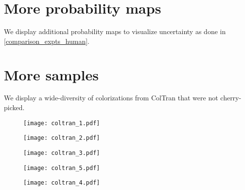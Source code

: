 \documentclass{article} \usepackage{iclr2021_conference,times}
\begin{document}
\section{More probability maps}




We display additional probability maps to visualize uncertainty as done in \ref{comparison_expts_human}.


\section{More samples}

We display a wide-diversity of colorizations from ColTran that were not cherry-picked.
\begin{figure}[htp]
\centering
\setlength{\lineskip}{0pt}

  \texttt{[image: coltran\_1.pdf]}
\end{figure}

\begin{figure}[htp]
\centering
\setlength{\lineskip}{0pt}

  \texttt{[image: coltran\_2.pdf]}
\end{figure}

\begin{figure}[htp]
\centering
\setlength{\lineskip}{0pt}

  \texttt{[image: coltran\_3.pdf]}
\end{figure}

\begin{figure}[htp]
\centering
\setlength{\lineskip}{0pt}

  \texttt{[image: coltran\_5.pdf]}
\end{figure}

\begin{figure}[htp]
\centering
\setlength{\lineskip}{0pt}

  \texttt{[image: coltran\_4.pdf]}
\end{figure}
\end{document}
